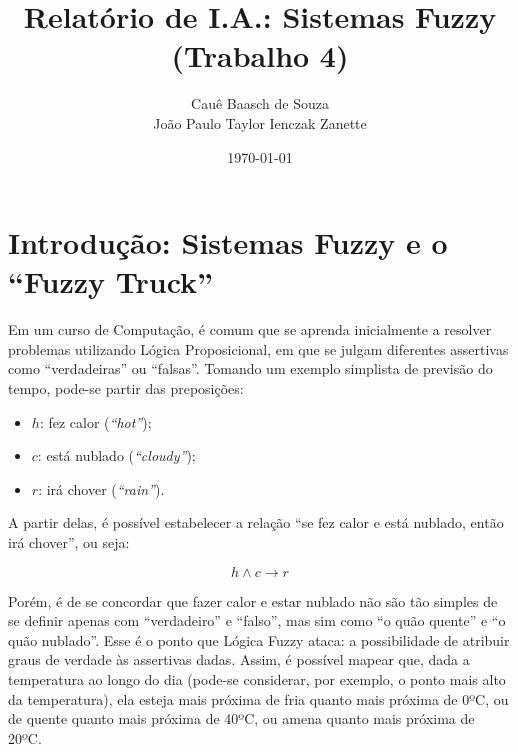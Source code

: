 \documentclass{article}
\title{Relatório de I.A.: Sistemas Fuzzy (Trabalho 4)}
\author{Cauê Baasch de Souza \\
        João Paulo Taylor Ienczak Zanette}
\date{\today}
\newcommand{\todo}[1]{{\color{red}{#1}}}
\begin{document}
    \maketitle{}

    \todo{%
        TO-DO\@:
        \begin{itemize}
            \item Descrever tutorial breve de Fuzzy;
            \item Entradas;
            \item Conjuntos Fuzzy;
            \item Regras;
            \item Método de defuzzificação;
            \item Dificuldades encontradas e como foram superadas.
        \end{itemize}
    }

    \section{Introdução: Sistemas Fuzzy e o ``Fuzzy Truck''}

    Em um curso de Computação, é comum que se aprenda inicialmente a resolver
    problemas utilizando Lógica Proposicional, em que se julgam diferentes
    assertivas como ``verdadeiras'' ou ``falsas''. Tomando um exemplo simplista
    de previsão do tempo, pode-se partir das preposições:

    \begin{itemize}
        \item $h$: fez calor (\textit{``hot''});
        \item $c$: está nublado (\textit{``cloudy''});
        \item $r$: irá chover (\textit{``rain''}).
    \end{itemize}

    A partir delas, é possível estabelecer a relação ``se fez calor e está
    nublado, então irá chover'', ou seja:

    \begin{equation}
        h \land c \rightarrow r
    \end{equation}

    Porém, é de se concordar que fazer calor e estar nublado não são tão
    simples de se definir apenas com ``verdadeiro'' e ``falso'', mas sim como
    ``o quão quente'' e ``o quão nublado''. Esse é o ponto que Lógica Fuzzy
    ataca: a possibilidade de atribuir graus de verdade às assertivas dadas.
    Assim, é possível mapear que, dada a temperatura ao longo do dia (pode-se
    considerar, por exemplo, o ponto mais alto da temperatura), ela esteja mais
    próxima de fria quanto mais próxima de 0ºC, ou de quente quanto mais
    próxima de 40ºC, ou amena quanto mais próxima de 20ºC.
\end{document}
